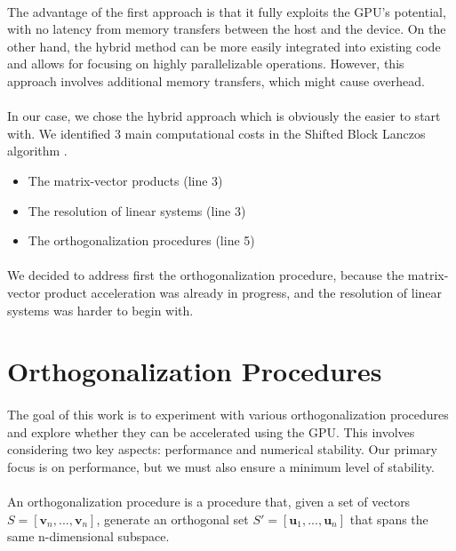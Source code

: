 \paragraph*{}
The advantage of the first approach is that it fully exploits the GPU's potential, with no latency from memory transfers between the host and the device. On the other hand, the hybrid method can be more easily integrated into existing code and allows for focusing on highly parallelizable operations. However, this approach involves additional memory transfers, which might cause overhead.

\paragraph*{}
In our case, we chose the hybrid approach which is obviously the easier to start with. We identified 3 main computational costs in the Shifted Block Lanczos algorithm .
\begin{itemize}
    \item The matrix-vector products (line 3)
    \item The resolution of linear systems (line 3)
    \item The orthogonalization procedures (line 5)
\end{itemize}

\paragraph*{}
We decided to address first the orthogonalization procedure, because the matrix-vector product acceleration was already in progress, and the resolution of linear systems was harder to begin with.

\section{Orthogonalization Procedures}\label{seq:ortho}
\paragraph*{}
The goal of this work is to experiment with various orthogonalization procedures and explore whether they can be accelerated using the GPU. This involves considering two key aspects: performance and numerical stability. Our primary focus is on performance, but we must also ensure a minimum level of stability.

\paragraph*{}
An orthogonalization procedure is a procedure that, given a set of vectors $S=[\mathbf{v}_n,...,\mathbf{v}_n]$, generate an orthogonal set $S'=[\mathbf{u}_1,...,\mathbf{u}_n]$ that spans the same n-dimensional subspace.

